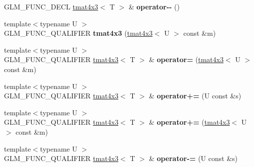 \begin{DoxyCompactItemize}
\item 
\hypertarget{structglm_1_1detail_1_1tmat4x3_a2cae7d9072aad10e4a383b9cffebfa89}{}G\+L\+M\+\_\+\+F\+U\+N\+C\+\_\+\+D\+E\+C\+L \hyperlink{structglm_1_1detail_1_1tmat4x3}{tmat4x3}$<$ T $>$ \& {\bfseries operator-\/-\/} ()\label{structglm_1_1detail_1_1tmat4x3_a2cae7d9072aad10e4a383b9cffebfa89}

\item 
\hypertarget{structglm_1_1detail_1_1tmat4x3_ac1f1b11937db1b18c5bab6d3e8474d2a}{}{\footnotesize template$<$typename U $>$ }\\G\+L\+M\+\_\+\+F\+U\+N\+C\+\_\+\+Q\+U\+A\+L\+I\+F\+I\+E\+R {\bfseries tmat4x3} (\hyperlink{structglm_1_1detail_1_1tmat4x3}{tmat4x3}$<$ U $>$ const \&m)\label{structglm_1_1detail_1_1tmat4x3_ac1f1b11937db1b18c5bab6d3e8474d2a}

\item 
\hypertarget{structglm_1_1detail_1_1tmat4x3_aa6c567fb06dffe57c62138199c62909b}{}{\footnotesize template$<$typename U $>$ }\\G\+L\+M\+\_\+\+F\+U\+N\+C\+\_\+\+Q\+U\+A\+L\+I\+F\+I\+E\+R \hyperlink{structglm_1_1detail_1_1tmat4x3}{tmat4x3}$<$ T $>$ \& {\bfseries operator=} (\hyperlink{structglm_1_1detail_1_1tmat4x3}{tmat4x3}$<$ U $>$ const \&m)\label{structglm_1_1detail_1_1tmat4x3_aa6c567fb06dffe57c62138199c62909b}

\item 
\hypertarget{structglm_1_1detail_1_1tmat4x3_ae57b4d591f904e8bebc8011f0543a4d8}{}{\footnotesize template$<$typename U $>$ }\\G\+L\+M\+\_\+\+F\+U\+N\+C\+\_\+\+Q\+U\+A\+L\+I\+F\+I\+E\+R \hyperlink{structglm_1_1detail_1_1tmat4x3}{tmat4x3}$<$ T $>$ \& {\bfseries operator+=} (U const \&s)\label{structglm_1_1detail_1_1tmat4x3_ae57b4d591f904e8bebc8011f0543a4d8}

\item 
\hypertarget{structglm_1_1detail_1_1tmat4x3_a88b637e78e891f1153ef848fd682bb8e}{}{\footnotesize template$<$typename U $>$ }\\G\+L\+M\+\_\+\+F\+U\+N\+C\+\_\+\+Q\+U\+A\+L\+I\+F\+I\+E\+R \hyperlink{structglm_1_1detail_1_1tmat4x3}{tmat4x3}$<$ T $>$ \& {\bfseries operator+=} (\hyperlink{structglm_1_1detail_1_1tmat4x3}{tmat4x3}$<$ U $>$ const \&m)\label{structglm_1_1detail_1_1tmat4x3_a88b637e78e891f1153ef848fd682bb8e}

\item 
\hypertarget{structglm_1_1detail_1_1tmat4x3_ad4e51c2e110e200cd338225936da452c}{}{\footnotesize template$<$typename U $>$ }\\G\+L\+M\+\_\+\+F\+U\+N\+C\+\_\+\+Q\+U\+A\+L\+I\+F\+I\+E\+R \hyperlink{structglm_1_1detail_1_1tmat4x3}{tmat4x3}$<$ T $>$ \& {\bfseries operator-\/=} (U const \&s)\label{structglm_1_1detail_1_1tmat4x3_ad4e51c2e110e200cd338225936da452c}


\end{DoxyCompactItemize}
